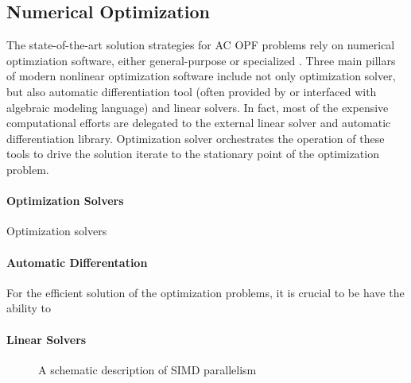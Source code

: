 \subsection{Numerical Optimization}\label{sec:numopt}
The state-of-the-art solution strategies for AC OPF problems rely on numerical optimziation software, either general-purpose \cite{} or specialized \cite{}.
Three main pillars of modern nonlinear optimization software include not only optimization solver, but also automatic differentiation tool (often provided by or interfaced with algebraic modeling language) and linear solvers. In fact, most of the expensive computational efforts are delegated to the external linear solver and automatic differentiation library. Optimization solver orchestrates the operation of these tools to drive the solution iterate to the stationary point of the optimization problem.

\paragraph{Optimization Solvers}
Optimization solvers 

\paragraph{Automatic Differentation}
For the efficient solution of the optimization problems, it is crucial to be have the ability to

\paragraph{Linear Solvers}



\begin{figure}
  \centering 
  \label{fig:simd}
  \caption{A schematic description of SIMD parallelism}
\end{figure}


